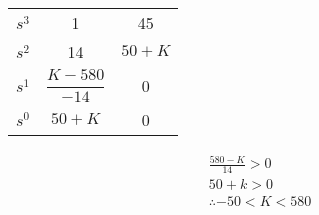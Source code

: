 \documentclass[main.tex]{subfile}
\begin{document}
\begin{enumerate}
		\begin{center}
			\begin{tabular}{l|cc}
				  $s^3$ & 1 & 45
				\\$s^2$ & 14 & $50+K$
				\\$s^1$ & $\dfrac{K-580}{-14}$ & 0
				\\$s^0$ & $50+K$ & 0
				\\\hline
			\end{tabular}
		\end{center}

		\begin{align*}
			\frac{580-K}{14} > 0
			\\50+k > 0
			\\\therefore \boxed{-50 < K < 580}
		\end{align*}

\end{enumerate}
\end{document}
